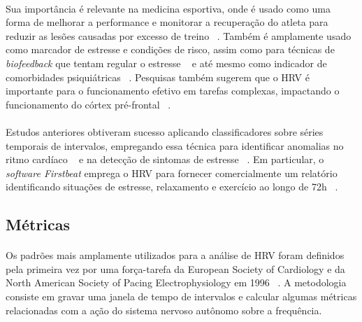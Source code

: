             \paragraph{} Sua importância é relevante na medicina esportiva, onde é usado como uma forma de melhorar a performance e monitorar a recuperação do atleta para reduzir as lesões causadas por excesso de treino ~\cite{Oweis2014QRSSurvey, Shaffer2017AnNorms., Plews2017ComparisonMethods}. Também é amplamente usado como marcador de estresse e condições de risco, assim como para técnicas de \textit{biofeedback} que tentam regular o estresse ~\cite{Vanitha2014HierarchicalVariability, Bernardi2000EffectsVariability, Prinsloo2011TheStress, Sasaki2014ConsciouslyActivity,  Quintana2016GuidelinesCommunication} e até mesmo como indicador de comorbidades psiquiátricas ~\cite{Quintana2016GuidelinesCommunication}. Pesquisas também sugerem que o HRV é importante para o funcionamento efetivo em tarefas complexas, impactando o funcionamento do córtex pré-frontal ~\cite{Hansen2004HeartDetraining, Luque-Casado2013CognitiveLevel}.
            
            \paragraph{} Estudos anteriores obtiveram sucesso aplicando classificadores sobre séries temporais de intervalos, empregando essa técnica para identificar anomalias no ritmo cardíaco ~\cite{Kampouraki2009HeartbeatMachines} e na detecção de sintomas de estresse ~\cite{Vanitha2014HierarchicalVariability, Sami2004ArtefactData}. Em particular, o \textit{software Firstbeat} emprega o HRV para fornecer comercialmente um relatório identificando situações de estresse, relaxamento e exercício ao longo de 72h ~\cite{FirstbeatTechnologiesLtd.StressVariability}.
            
        \subsection {Métricas}
        
            \paragraph{} Os padrões mais amplamente utilizados para a análise de HRV foram definidos pela primeira vez por uma força-tarefa da European Society of Cardiology e da North American Society of Pacing Electrophysiology em 1996 ~\cite{TaskForceoftheEuropeanSocietyofCardiologytheNorthAmericanSocietyofPacing1996HeartUse}. A metodologia consiste em gravar uma janela de tempo de intervalos e calcular algumas métricas relacionadas com a ação do sistema nervoso autônomo sobre a frequência. 
            
